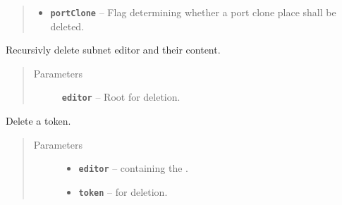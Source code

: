 \documentclass[a4paper,10pt,english]{sphinxmanual}
\begin{document}
\begin{fulllineitems}
\begin{fulllineitems}
\begin{quote}
\begin{description}
\begin{itemize}
\item {} 
\textbf{\texttt{portClone}} -- Flag determining whether a port clone place shall be deleted.

\end{itemize}

\end{description}\end{quote}

\end{fulllineitems}


\begin{fulllineitems}
\label{gui_link:gui.DiagramEditor.DiagramEditor.deleteSubnet}
Recursivly delete subnet editor and their content.
\begin{quote}\begin{description}
\item[{Parameters}] \leavevmode
\textbf{\texttt{editor}} -- Root  for deletion.

\end{description}\end{quote}

\end{fulllineitems}


\begin{fulllineitems}
\label{gui_link:gui.DiagramEditor.DiagramEditor.deleteToken}
Delete a token.
\begin{quote}\begin{description}
\item[{Parameters}] \leavevmode\begin{itemize}
\item {} 
\textbf{\texttt{editor}} --  containing the .

\item {} 
\textbf{\texttt{token}} --  for deletion.

\end{itemize}

\end{description}\end{quote}

\end{fulllineitems}


\end{fulllineitems}
\end{document}
